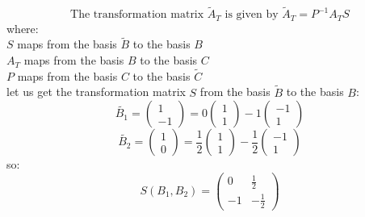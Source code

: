 \documentclass[a3paper,12pt]{extarticle} %
\begin{document}
\begin{enumerate}
\begin{enumerate}
        \[
            \text{The transformation matrix } \tilde{A}_T \text{ is given by } \tilde{A}_T = P^{-1}A_TS
        \]
        where:\\
        \(S\) maps from the basis \(\tilde{B}\) to the basis \(B\)\\
        \(A_T\) maps from the basis \(B\) to the basis \(C\)\\
        \(P\) maps from the basis \(C\) to the basis \(\tilde{C}\)\\
        let us get the transformation matrix \( S \) from the basis \( \tilde{B} \) to the basis \( B \):
        \[
           \tilde{B_1} = \begin{pmatrix} 1 \\ -1 \end{pmatrix} = 0 \begin{pmatrix} 1 \\ 1 \end{pmatrix} - 1 \begin{pmatrix} -1 \\ 1 \end{pmatrix}
        \]
        \[
            \tilde{B_2} = \begin{pmatrix} 1 \\ 0 \end{pmatrix} = \frac{1}{2} \begin{pmatrix} 1 \\ 1 \end{pmatrix} - \frac{1}{2} \begin{pmatrix} -1 \\ 1 \end{pmatrix}
        \]
        so:
        \[
            S(B_1, B_2) = \begin{pmatrix} 0 & \frac{1}{2} \\ -1 & -\frac{1}{2} \end{pmatrix}
        \]


\end{enumerate}
\end{enumerate}
\end{document}
